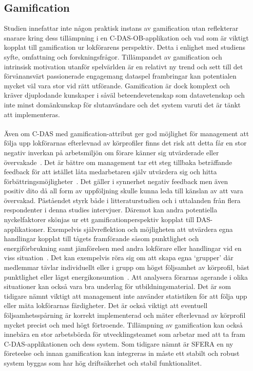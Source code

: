 \subsection{Gamification}
Studien innefattar inte någon praktisk instans av gamification utan reflekterar snarare kring dess tillämpning i en C-DAS-OB-applikation och vad som är viktigt kopplat till gamification ur lokförarens perspektiv.
Detta i enlighet med studiens syfte, omfattning och forskningsfrågor.
Tillämpandet av gamification och intrinsisk motivation utanför spelvärlden är en relativt ny trend och sett till det förvånansvärt passionerade engagemang dataspel frambringar kan potentialen mycket väl vara stor vid rätt utförande.
Gamification är dock komplext och kräver djuplodande kunskaper i såväl beteendevetenskap som datavetenskap och inte minst domänkunskap för slutanvändare och det system varuti det är tänkt att implementeras.
\paragraph{}
\hspace{-11pt}Även om C-DAS med gamification-attribut ger god möjlighet för management att följa upp lokförarnas efterlevnad av körprofiler finns det risk att detta får en stor negativ inverkan på arbetsmiljön om förare känner sig utvärderade eller övervakade~\cite{Bae2014}.
Det är bättre om management tar ett steg tillbaka beträffande feedback för att istället låta medarbetaren själv utvärdera sig och hitta förbättringsmöjligheter~\cite{Cwil2018}.
Det gäller i synnerhet negativ feedback men även positiv dito då all form av uppföljning skulle kunna leda till känslan av att vara övervakad.
Påståendet styrk både i litteraturstudien och i uttalanden från flera respondenter i denna studies intervjuer.
Däremot kan andra potentiella nyckelfaktorer skönjas ur ett gamificationperspektiv kopplat till DAS-applikationer.
Exempelvis självreflektion och möjligheten att utvärdera egna handlingar kopplat till tågets framförande såsom punktlighet och energiförbrukning samt jämförelsen med andra lokförare eller handlingar vid en viss situation~\cite{Bae2014, Cwil2018}.
Det kan exempelvis röra sig om att skapa egna \lq{}grupper\rq{} där medlemmar tävlar individuellt eller i grupp om högst följsamhet av körprofil, bäst punktlighet eller lägst energikonsumtion~\cite{Bae2014}.
Att analysera förarnas agerande i olika situationer kan också vara bra underlag för utbildningsmaterial.
Det är som tidigare nämnt viktigt att management inte använder statistiken för att följa upp eller mäta lokförarnas färdigheter.
Det är också viktigt att eventuell följsamhetsspårning är korrekt implementerad och mäter efterlevnad av körprofil mycket precist och med högt förtroende.
Tillämpning av gamification kan också innebära en stor arbetsbörda för utvecklingsteamet som arbetar med att ta fram C-DAS-applikationen och dess system.
Som tidigare nämnt är SFERA en ny företeelse och innan gamification kan integreras in måste ett stabilt och robust system byggas som har hög driftsäkerhet och stabil funktionalitet.

